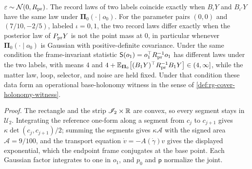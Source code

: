 \(\varepsilon\sim\mathcal N(0,R_{\rm pr})\). The record laws of two labels
coincide exactly when \(B_\iota Y\) and \(B_{\iota'}Y\) have the same law under
\(\boldsymbol\Pi_0(\cdot\mid o_0)\). For the parameter pairs \((0,0)\) and
\((7/10,-2/5)\), labeled \(\iota=0,1\), the two record laws differ exactly when
the posterior law of \(P_{\rm pr}Y\) is not the point mass at \(0\), in particular
whenever \(\boldsymbol\Pi_0(\cdot\mid o_0)\) is Gaussian with positive-definite
covariance. Under the same condition the frame-invariant statistic
\(\mathsf S(o_1)=o_1^\top R_{\rm pr}^{-1}o_1\) has different laws under the two
labels, with means \(4\) and
\(4+\mathbb E_{\boldsymbol\Pi_0}\bigl[(B_1Y)^\top R_{\rm pr}^{-1}B_1Y\bigr]\in(4,\infty]\),
while the matter law, loop, selector, and noise are held fixed. Under that
condition these data form an operational base-holonomy witness in the sense of
\cref{def:rg-cover-holonomy-witness}. 

\noindent\emph{Proof.}
The rectangle and the strip \(\mathscr I_2\times\mathbb R\) are convex, so every segment
stays in \(\mathcal U_2\). Integrating the reference one-form along a segment
from \(c_j\) to \(c_{j+1}\) gives \(\kappa\det(c_j,c_{j+1})/2\); summing the
segments gives \(\kappa\mathcal A\) with the signed area \(\mathcal A=9/100\), and
the transport equation \(\dot v=-A(\dot\gamma)v\) gives the displayed exponential,
which the endpoint frame conjugates at the base point. Each Gaussian factor
integrates to one in \(o_1\), and \(p_0\) and \(\mathsf p\) normalize the joint.

